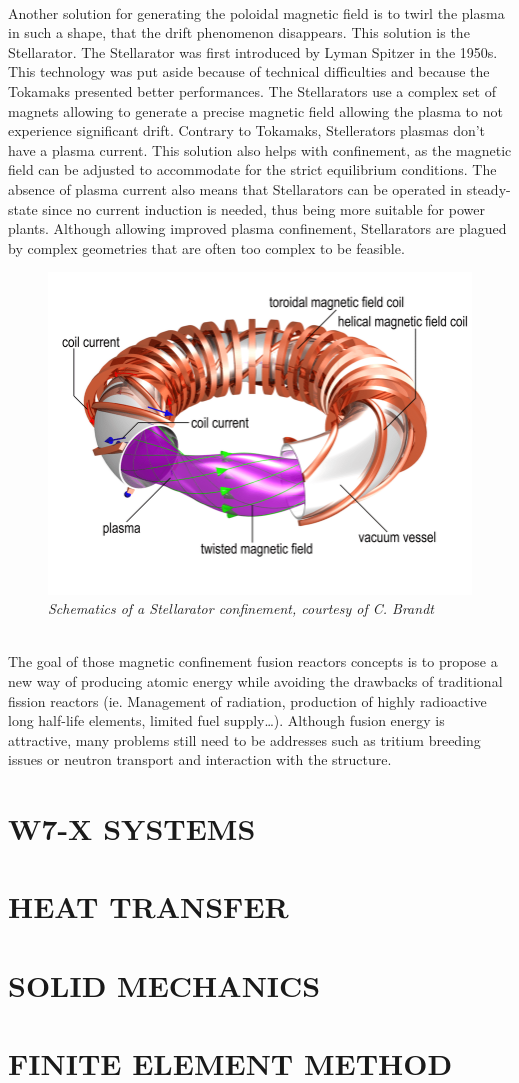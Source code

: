 \\
\break
\normalsize{\indent Another solution for generating the poloidal magnetic field is to twirl the plasma in such a shape, that the drift phenomenon disappears. This solution is the Stellarator. The Stellarator was first introduced by Lyman Spitzer in the 1950s. This technology was put aside because of technical difficulties and because the Tokamaks presented better performances. The Stellarators use a complex set of magnets allowing to generate a precise magnetic field allowing the plasma to not experience significant drift. Contrary to Tokamaks, Stellerators plasmas don’t have a plasma current. This solution also helps with confinement, as the magnetic field can be adjusted to accommodate for the strict equilibrium conditions. The absence of plasma current also means that Stellarators can be operated in steady-state since no current induction is needed, thus being more suitable for power plants. Although allowing improved plasma confinement, Stellarators are plagued by complex geometries that are often too complex to be feasible.}
\begin{figure}[h!]
    \centering
    \includegraphics[width=.6\textwidth]{figures/fig_3.png}
    \caption{\it Schematics of a Stellarator confinement, courtesy of C. Brandt}
\end{figure}
\\
\normalsize{\indent The goal of those magnetic confinement fusion reactors concepts is to propose a new way of producing atomic energy while avoiding the drawbacks of traditional fission reactors (ie. Management of radiation, production of highly radioactive long half-life elements, limited fuel supply…). Although fusion energy is attractive, many problems still need to be addresses such as tritium breeding issues or neutron transport and interaction with the structure.}
\section{W7-X SYSTEMS}

\section{HEAT TRANSFER}


\section{SOLID MECHANICS}

\section{FINITE ELEMENT METHOD}

